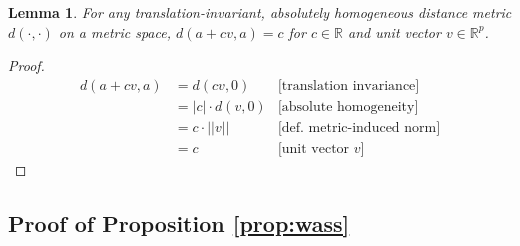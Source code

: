 \documentclass{article}
\newtheorem{lemma}[theorem]{Lemma}
\newcommand{\R}{\mathbb{R}}
\newcommand{\Rp}{\mathbb{R}^p}
\begin{document}
\begin{lemma}
\label{lem:unitdist}
For any translation-invariant, absolutely homogeneous distance metric $d(\cdot, \cdot)$ on a metric space, $d(a + cv, a) = c$ for $c \in \R$ and unit vector $v \in \Rp$.
\end{lemma}
\begin{proof}
\begin{align*}
    d(a + cv, a)
    &= d(cv, 0) &\text{[translation invariance]} \\
    &= |c| \cdot d(v, 0) &\text{[absolute homogeneity]} \\
    &= c \cdot ||v|| &\text{[def. metric-induced norm]} \\
    &= c &\text{[unit vector } v\text{]}
\end{align*}
\end{proof}

\subsection{Proof of Proposition \ref{prop:wass}}
\label{app:wass}

\end{document}
